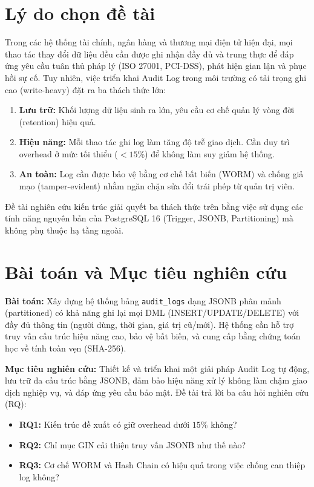 \section{Lý do chọn đề tài}

Trong các hệ thống tài chính, ngân hàng và thương mại điện tử hiện đại, mọi thao tác thay đổi dữ liệu đều cần được ghi nhận đầy đủ và trung thực để đáp ứng yêu cầu tuân thủ pháp lý (ISO 27001, PCI-DSS), phát hiện gian lận và phục hồi sự cố. Tuy nhiên, việc triển khai Audit Log trong môi trường có tải trọng ghi cao (write-heavy) đặt ra ba thách thức lớn:
\begin{enumerate}
    \item \textbf{Lưu trữ:} Khối lượng dữ liệu sinh ra lớn, yêu cầu cơ chế quản lý vòng đời (retention) hiệu quả.
    \item \textbf{Hiệu năng:} Mỗi thao tác ghi log làm tăng độ trễ giao dịch. Cần duy trì overhead ở mức tối thiểu ($< 15\%$) để không làm suy giảm hệ thống.
    \item \textbf{An toàn:} Log cần được bảo vệ bằng cơ chế bất biến (WORM) và chống giả mạo (tamper-evident) nhằm ngăn chặn sửa đổi trái phép từ quản trị viên.
\end{enumerate}

Đề tài nghiên cứu kiến trúc giải quyết ba thách thức trên bằng việc sử dụng các tính năng nguyên bản của PostgreSQL 16 (Trigger, JSONB, Partitioning) mà không phụ thuộc hạ tầng ngoài.

\section{Bài toán và Mục tiêu nghiên cứu}

\textbf{Bài toán:} Xây dựng hệ thống bảng \texttt{audit\_logs} dạng JSONB phân mảnh (partitioned) có khả năng ghi lại mọi DML (INSERT/UPDATE/DELETE) với đầy đủ thông tin (người dùng, thời gian, giá trị cũ/mới). Hệ thống cần hỗ trợ truy vấn cấu trúc hiệu năng cao, bảo vệ bất biến, và cung cấp bằng chứng toán học về tính toàn vẹn (SHA-256).

\textbf{Mục tiêu nghiên cứu:} Thiết kế và triển khai một giải pháp Audit Log tự động, lưu trữ đa cấu trúc bằng JSONB, đảm bảo hiệu năng xử lý không làm chậm giao dịch nghiệp vụ, và đáp ứng yêu cầu bảo mật. Đề tài trả lời ba câu hỏi nghiên cứu (RQ):
\begin{itemize}
    \item \textbf{RQ1:} Kiến trúc đề xuất có giữ overhead dưới $15\%$ không?
    \item \textbf{RQ2:} Chỉ mục GIN cải thiện truy vấn JSONB như thế nào?
    \item \textbf{RQ3:} Cơ chế WORM và Hash Chain có hiệu quả trong việc chống can thiệp log không?
\end{itemize}

